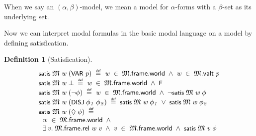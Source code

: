 \documentclass[letterpaper]{article}
\newtheorem{defn}{Definition}
\renewcommand{\HOLConst}[1]{{\textsf{\upshape\small #1}}}
\newenvironment{holmath}{\begin{displaymath}\begin{array}{l}}{\end{array}\end{displaymath}\ignorespacesafterend}
\begin{document}
When we say an $(\alpha,\beta)$-model, we mean a model for $\alpha$-forms with a $\beta$-set as its underlying set.

Now we can interpret modal formulas in the basic modal language on a model by defining satisfication.
\begin{defn}[Satisfication]
\begin{holmath}
  \HOLConst{satis}\;\HOLFreeVar{\ensuremath{\mathfrak{M}}}\;\HOLFreeVar{w}\;(\HOLConst{VAR}\;\HOLFreeVar{p})\;\HOLSymConst{\HOLTokenDefEquality{}}\;\HOLFreeVar{w}\;\HOLSymConst{\HOLTokenIn{}}\;\HOLFreeVar{\ensuremath{\mathfrak{M}}}.\HOLFieldName{frame}.\HOLFieldName{world}\;\HOLSymConst{\HOLTokenConj{}}\;\HOLFreeVar{w}\;\HOLSymConst{\HOLTokenIn{}}\;\HOLFreeVar{\ensuremath{\mathfrak{M}}}.\HOLFieldName{valt}\;\HOLFreeVar{p}\\
\HOLConst{satis}\;\HOLFreeVar{\ensuremath{\mathfrak{M}}}\;\HOLFreeVar{w}\;\HOLSymConst{\ensuremath{\bot}}\;\HOLSymConst{\HOLTokenDefEquality{}}\;\HOLFreeVar{w}\;\HOLSymConst{\HOLTokenIn{}}\;\HOLFreeVar{\ensuremath{\mathfrak{M}}}.\HOLFieldName{frame}.\HOLFieldName{world}\;\HOLSymConst{\HOLTokenConj{}}\;\HOLConst{F}\\
\HOLConst{satis}\;\HOLFreeVar{\ensuremath{\mathfrak{M}}}\;\HOLFreeVar{w}\;(\HOLSymConst{\HOLTokenNeg{}}\HOLFreeVar{\ensuremath{\phi}})\;\HOLSymConst{\HOLTokenDefEquality{}}\;\HOLFreeVar{w}\;\HOLSymConst{\HOLTokenIn{}}\;\HOLFreeVar{\ensuremath{\mathfrak{M}}}.\HOLFieldName{frame}.\HOLFieldName{world}\;\HOLSymConst{\HOLTokenConj{}}\;\HOLSymConst{\HOLTokenNeg{}}\HOLConst{satis}\;\HOLFreeVar{\ensuremath{\mathfrak{M}}}\;\HOLFreeVar{w}\;\HOLFreeVar{\ensuremath{\phi}}\\
\HOLConst{satis}\;\HOLFreeVar{\ensuremath{\mathfrak{M}}}\;\HOLFreeVar{w}\;(\HOLConst{DISJ}\;\HOLFreeVar{\ensuremath{\phi\sb{1}}}\;\HOLFreeVar{\ensuremath{\phi\sb{2}}})\;\HOLSymConst{\HOLTokenDefEquality{}}\;\HOLConst{satis}\;\HOLFreeVar{\ensuremath{\mathfrak{M}}}\;\HOLFreeVar{w}\;\HOLFreeVar{\ensuremath{\phi\sb{1}}}\;\HOLSymConst{\HOLTokenDisj{}}\;\HOLConst{satis}\;\HOLFreeVar{\ensuremath{\mathfrak{M}}}\;\HOLFreeVar{w}\;\HOLFreeVar{\ensuremath{\phi\sb{2}}}\\
\HOLConst{satis}\;\HOLFreeVar{\ensuremath{\mathfrak{M}}}\;\HOLFreeVar{w}\;(\HOLSymConst{\ensuremath{\Diamond}}\;\HOLFreeVar{\ensuremath{\phi}})\;\HOLSymConst{\HOLTokenDefEquality{}}\\
\;\;\HOLFreeVar{w}\;\HOLSymConst{\HOLTokenIn{}}\;\HOLFreeVar{\ensuremath{\mathfrak{M}}}.\HOLFieldName{frame}.\HOLFieldName{world}\;\HOLSymConst{\HOLTokenConj{}}\\
\;\;\HOLSymConst{\HOLTokenExists{}}\HOLBoundVar{v}.\;\HOLFreeVar{\ensuremath{\mathfrak{M}}}.\HOLFieldName{frame}.\HOLFieldName{rel}\;\HOLFreeVar{w}\;\HOLBoundVar{v}\;\HOLSymConst{\HOLTokenConj{}}\;\HOLBoundVar{v}\;\HOLSymConst{\HOLTokenIn{}}\;\HOLFreeVar{\ensuremath{\mathfrak{M}}}.\HOLFieldName{frame}.\HOLFieldName{world}\;\HOLSymConst{\HOLTokenConj{}}\;\HOLConst{satis}\;\HOLFreeVar{\ensuremath{\mathfrak{M}}}\;\HOLBoundVar{v}\;\HOLFreeVar{\ensuremath{\phi}}
\end{holmath}
\end{defn}
\end{document}
